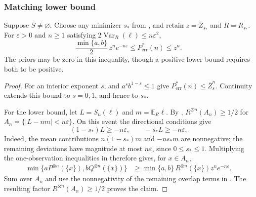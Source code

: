 \subsubsection{Matching lower bound}
\label{sec:chernoff-converse}

\begin{theorem}
\label{thm:chernoff-converse}
Suppose $S\ne\varnothing$. Choose any minimizer $s_*$ from
, and retain
$z=\overline Z_{s_*}$ and $R=R_{s_*}$. For $\varepsilon>0$ and
$n\ge1$ satisfying $2\operatorname{Var}_R(\ell)\le n\varepsilon^2$,
\[
 \frac{\min\{a,b\}}2\,z^n e^{-n\varepsilon}
 \le P_{\mathrm{err}}^*(n)\le z^n.
\]
The priors may be zero in this inequality, though a positive lower
bound requires both to be positive.
\end{theorem}
\begin{proof}
For an interior exponent $s$,  and
$a^sb^{1-s}\le1$ give $P_{\mathrm{err}}^*(n)\le\overline Z_s^n$.
Continuity extends this bound to $s=0,1$, and hence to $s_*$.

For the lower bound, let $L=S_n(\ell)$ and $m=\mathbb E_R\ell$.
By ,
$R^{\otimes n}(A_n)\ge1/2$ for
$A_n=\{|L-nm|<n\varepsilon\}$.
On this event the directional conditions give
\[
 (1-s_*)L\ge-n\varepsilon,\qquad -s_*L\ge-n\varepsilon.
\]
Indeed, the mean contributions $n(1-s_*)m$ and $-ns_*m$
are nonnegative; the remaining deviations have magnitude at most
$n\varepsilon$, since $0\le s_*\le1$.
Multiplying the one-observation inequalities in
 therefore gives, for $x\in A_n$,
\[
 \begin{aligned}
 \min\{aP^{\otimes n}(\{x\}),bQ^{\otimes n}(\{x\})\}
 &\ge \min\{a,b\}\,R^{\otimes n}(\{x\})z^n e^{-n\varepsilon}.
 \end{aligned}
\]
Sum over $A_n$ and use the nonnegativity of the remaining overlap
terms in . The resulting factor
$R^{\otimes n}(A_n)\ge1/2$ proves the claim.
\end{proof}
